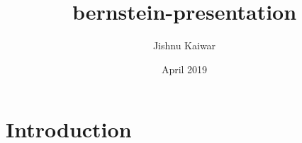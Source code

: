 \documentclass{article}
\title{bernstein-presentation}
\author{Jishnu Kaiwar}
\date{April 2019}
\begin{document}
\maketitle

\section{Introduction}
\end{document}
